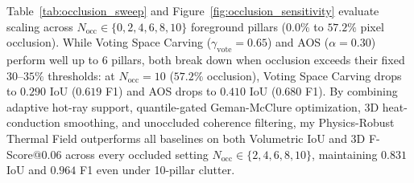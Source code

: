 \documentclass[12pt,letterpaper]{article}
\begin{document}
\begin{table}[!htbp]
  \centering
  \caption{Component-Wise Ablation Study of the Proposed Physics-Informed Robust Thermal Radiance Field}
  \label{tab:ablation}
\end{table}

Table~\ref{tab:occlusion_sweep} and Figure~\ref{fig:occlusion_sensitivity} evaluate scaling across $N_{\text{occ}} \in \{0, 2, 4, 6, 8, 10\}$ foreground pillars ($0.0\%$ to $57.2\%$ pixel occlusion). While Voting Space Carving ($\gamma_{\text{vote}}=0.65$) and AOS ($\alpha=0.30$) perform well up to 6 pillars, both break down when occlusion exceeds their fixed $30\text{--}35\%$ thresholds: at $N_{\text{occ}} = 10$ ($57.2\%$ occlusion), Voting Space Carving drops to $0.290$ IoU ($0.619$ F1) and AOS drops to $0.410$ IoU ($0.680$ F1). By combining adaptive hot-ray support, quantile-gated Geman-McClure optimization, 3D heat-conduction smoothing, and unoccluded coherence filtering, my Physics-Robust Thermal Field outperforms all baselines on both Volumetric IoU and 3D F-Score@0.06 across every occluded setting $N_{\text{occ}} \in \{2, 4, 6, 8, 10\}$, maintaining $0.831$ IoU and $0.964$ F1 even under 10-pillar clutter.
\end{document}
